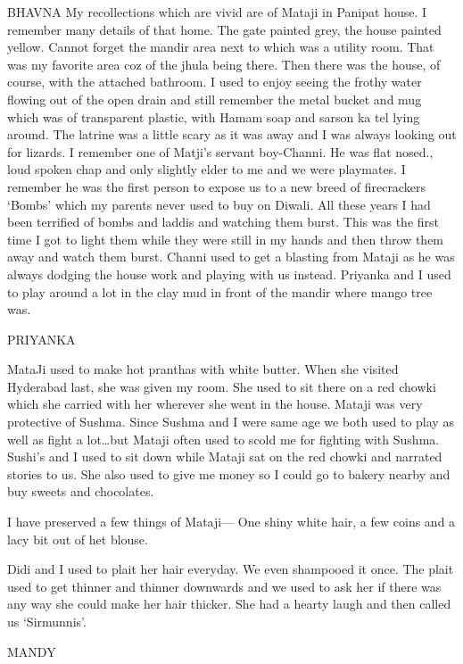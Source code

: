 BHAVNA
My recollections which are vivid are of Mataji in Panipat house. I remember many details of that home. The gate painted grey, the house painted yellow. Cannot forget the mandir area next to which was a utility room. That was my favorite area coz of the jhula being there. Then there was the house, of course, with the attached bathroom. I used to enjoy seeing the frothy water flowing out of the open drain and still remember the metal bucket and mug which was of transparent plastic, with Hamam soap and sarson ka tel lying around. The latrine was a little scary as it was away and I was always looking out for lizards. 
I remember one of Matji’s servant boy-Channi. He was flat nosed., loud spoken chap and only slightly elder to me and we were playmates. I remember he was the first person to expose us to a new breed of firecrackers ‘Bombs’ which my parents never used to buy on Diwali. All these years I had been terrified of bombs and laddis and watching them burst. This was the first time I got to light them while they were still in my hands and then throw them away and watch them burst. Channi used to get a blasting from Mataji as he was always dodging the house work and playing with us instead. Priyanka and I used to play around a lot in the clay mud in front of the mandir where mango tree was. 

PRIYANKA 

MataJi used to make hot pranthas with white butter. When she visited Hyderabad last, she was given my room. She used to sit there on a red chowki which she carried with her wherever she went in the house. Mataji was very protective of Sushma. Since Sushma and I were same age we both used to play as well as fight a lot…but Mataji often used to scold me for fighting with Sushma. Sushi’s and I used to sit down while Mataji sat on the red chowki and narrated stories to us. 
She also used to give me money so I could go to bakery nearby and buy sweets and chocolates.

I have preserved a few things of Mataji—
One shiny white hair, a few coins and a lacy bit out of het blouse. 

Didi and I used to plait her hair everyday. We even shampooed it once. The plait used to get thinner and thinner downwards and we used to ask her if there was any way she could make her hair thicker. She had a hearty laugh and then called us ‘Sirmunnis’.







MANDY

